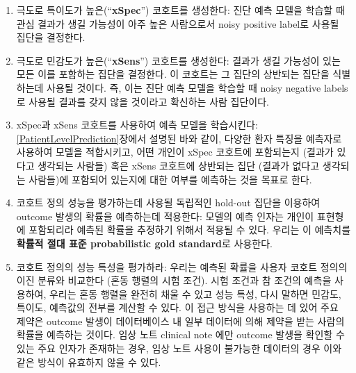 \documentclass[10.5pt]{book}
\providecommand{\tightlist}{%
  \setlength{\itemsep}{0pt}\setlength{\parskip}{0pt}}
\theoremstyle{definition}
\theoremstyle{definition}
\theoremstyle{definition}
\theoremstyle{remark}
\begin{document}
\begin{enumerate}
\def\labelenumi{\arabic{enumi}.}
\tightlist
\item
  극도로 특이도가 높은(``\textbf{xSpec}'') 코호트를 생성한다: 진단 예측
  모델을 학습할 때 관심 결과가 생길 가능성이 아주 높은 사람으로서 noisy
  positive label로 사용될 집단을 결정한다.
\item
  극도로 민감도가 높은(``\textbf{xSens}'') 코호트를 생성한다: 결과가
  생길 가능성이 있는 모든 이를 포함하는 집단을 결정한다. 이 코호트는 그
  집단의 상반되는 집단을 식별하는데 사용될 것이다. 즉, 이는 진단 예측
  모델을 학습할 때 noisy negative labels로 사용될 결과를 갖지 않을
  것이라고 확신하는 사람 집단이다.
\item
  xSpec과 xSens 코호트를 사용하여 예측 모델을 학습시킨다:
  \ref{PatientLevelPrediction}장에서 설명된 바와 같이, 다양한 환자
  특징을 예측자로 사용하여 모델을 적합시키고, 어떤 개인이 xSpec 코호트에
  포함되는지 (결과가 있다고 생각되는 사람들) 혹은 xSens 코호트에
  상반되는 집단 (결과가 없다고 생각되는 사람들)에 포함되어 있는지에 대한
  여부를 예측하는 것을 목표로 한다.
\item
  코호트 정의 성능을 평가하는데 사용될 독립적인 hold-out 집단을 이용하여
  outcome 발생의 확률을 예측하는데 적용한다: 모델의 예측 인자는 개인이
  표현형에 포함되리라 예측된 확률을 추정하기 위해서 적용될 수 있다.
  우리는 이 예측치를 \textbf{확률적 절대 표준 probabilistic gold
  standard}로 사용한다.
\item
  코호트 정의의 성능 특성을 평가하라: 우리는 예측된 확률을 사용자 코호트
  정의의 이진 분류와 비교한다 (혼동 행렬의 시험 조건). 시험 조건과 참
  조건의 예측을 사용하여, 우리는 혼동 행렬을 완전히 채울 수 있고 성능
  특성, 다시 말하면 민감도, 특이도, 예측값의 전부를 계산할 수 있다. 이
  접근 방식을 사용하는 데 있어 주요 제약은 outcome 발생이 데이터베이스
  내 일부 데이터에 의해 제약을 받는 사람의 확률을 예측하는 것이다. 임상
  노트 clinical note 에만 outcome 발생을 확인할 수 있는 주요 인자가
  존재하는 경우, 임상 노트 사용이 불가능한 데이터의 경우 이와 같은
  방식이 유효하지 않을 수 있다.
\end{enumerate}
\end{document}
